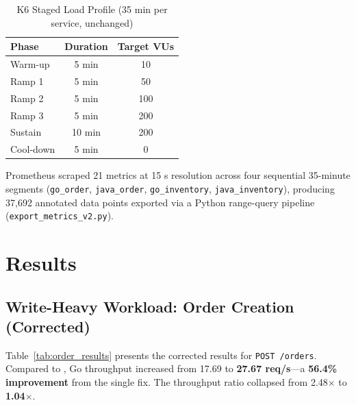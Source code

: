 \documentclass[conference]{IEEEtran}
\begin{document}
\begin{table}[htbp]
\caption{K6 Staged Load Profile (35 min per service, unchanged)}
\begin{center}
\begin{tabular}{|l|c|c|}
\hline
\textbf{Phase} & \textbf{Duration} & \textbf{Target VUs} \\
\hline
Warm-up   & 5 min  & 10  \\
Ramp 1    & 5 min  & 50  \\
Ramp 2    & 5 min  & 100 \\
Ramp 3    & 5 min  & 200 \\
Sustain   & 10 min & 200 \\
Cool-down & 5 min  & 0   \\
\hline
\end{tabular}
\label{tab:loadprofile}
\end{center}
\end{table}

Prometheus scraped 21 metrics at 15 s resolution across four sequential 35-minute segments (\texttt{go\_order}, \texttt{java\_order}, \texttt{go\_inventory}, \texttt{java\_inventory}), producing 37,692 annotated data points exported via a Python range-query pipeline (\texttt{export\_metrics\_v2.py}).

\section{Results}

\subsection{Write-Heavy Workload: Order Creation (Corrected)}

Table~\ref{tab:order_results} presents the corrected results for \texttt{POST /orders}. Compared to \cite{b10}, Go throughput increased from 17.69 to \textbf{27.67 req/s}---a \textbf{56.4\% improvement} from the single fix. The throughput ratio collapsed from 2.48$\times$ to \textbf{1.04$\times$}.
\end{document}

